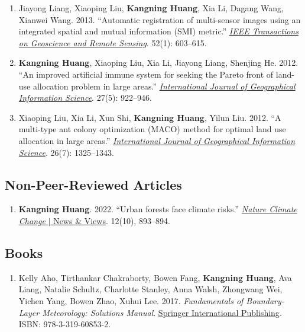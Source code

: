 \documentclass[11pt,letterpaper]{article}
\begin{document}
\begin{enumerate}
  \item Jiayong Liang, Xiaoping Liu, \textbf{Kangning Huang}, Xia Li, Dagang Wang, Xianwei Wang. 2013. ``Automatic registration of multi-sensor images using an integrated spatial and mutual information (SMI) metric.'' \href{https://badge.dimensions.ai/details/doi/10.1109/tgrs.2013.2242895}{\textit{IEEE Transactions on Geoscience and Remote Sensing}}. 52(1): 603--615.

  \item \textbf{Kangning Huang}, Xiaoping Liu, Xia Li, Jiayong Liang, Shenjing He. 2012. ``An improved artificial immune system for seeking the Pareto front of land-use allocation problem in large areas.'' \href{https://badge.dimensions.ai/details/doi/10.1080/13658816.2012.730147}{\textit{International Journal of Geographical Information Science}}. 27(5): 922--946.

  \item Xiaoping Liu, Xia Li, Xun Shi, \textbf{Kangning Huang}, Yilun Liu. 2012. ``A multi-type ant colony optimization (MACO) method for optimal land use allocation in large areas.'' \href{https://badge.dimensions.ai/details/id/pub.1032175137}{\textit{International Journal of Geographical Information Science}}. 26(7): 1325--1343.
\end{enumerate}

\subsection{Non-Peer-Reviewed Articles}
\begin{enumerate}
  \item \textbf{Kangning Huang}. 2022. ``Urban forests face climate risks.'' \href{https://www.nature.com/articles/s41558-022-01481-8}{\textit{Nature Climate Change} $\vert$ News \& Views}. 12(10), 893--894.
\end{enumerate}

\subsection{Books}
\begin{enumerate}
  \item Kelly Aho, Tirthankar Chakraborty, Bowen Fang, \textbf{Kangning Huang}, Ava Liang, Natalie Schultz, Charlotte Stanley, Anna Walsh, Zhongwang Wei, Yichen Yang, Bowen Zhao, Xuhui Lee. 2017. \textit{Fundamentals of Boundary-Layer Meteorology: Solutions Manual}. \href{https://www.springer.com/us/book/9783319608518}{Springer International Publishing}. ISBN: 978-3-319-60853-2.
\end{enumerate}
\end{document}
